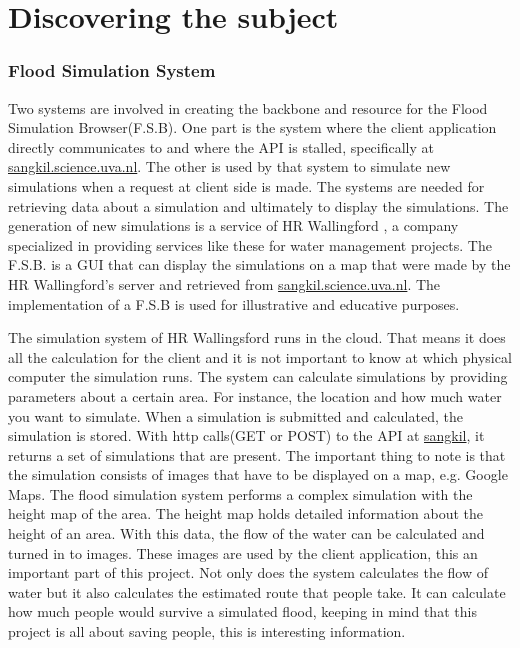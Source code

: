 \part{Discovering the subject}
\label{part:Discovering}
\section{Flood Simulation System}
Two systems are involved in creating the backbone and resource for the Flood Simulation Browser(F.S.B). One part is the system where the client application directly communicates to and where the API is stalled, specifically at \url{sangkil.science.uva.nl}. The other is used by that system to simulate new simulations when a request at client side is made. The systems are needed for retrieving data about a simulation and ultimately to display the simulations. The generation of new simulations is a service of HR Wallingford \cite{wallingford}, a company specialized in providing services like these for water management projects. The F.S.B. is a GUI\cite{GUI} that can display the simulations on a map that were made by the HR Wallingford's server and retrieved from \url{sangkil.science.uva.nl}. The implementation of a F.S.B is used for illustrative and educative purposes.

The simulation system of HR Wallingsford runs in the cloud\cite{cloud}. That means it does all the calculation for the client and it is not important to know at which physical computer the simulation runs. The system can calculate simulations by providing parameters about a certain area. For instance, the location and how much water you want to simulate. When a simulation is submitted and calculated, the simulation is stored. With http calls(GET or POST) to the API at \url{sangkil}, it returns a set of simulations that are present. The important thing to note is that the simulation consists of images that have to be displayed on a map, e.g. Google Maps. The flood simulation system performs a complex simulation with the height map of the area. The height map holds detailed information about the height of an area. With this data, the flow of the water can be calculated and turned in to images. These images are used by the client application, this an important part of this project.
Not only does the system calculates the flow of water but it also calculates the estimated route that people take. It can calculate how much people would survive a simulated flood, keeping in mind that this project is all about saving people, this is interesting information.
 
